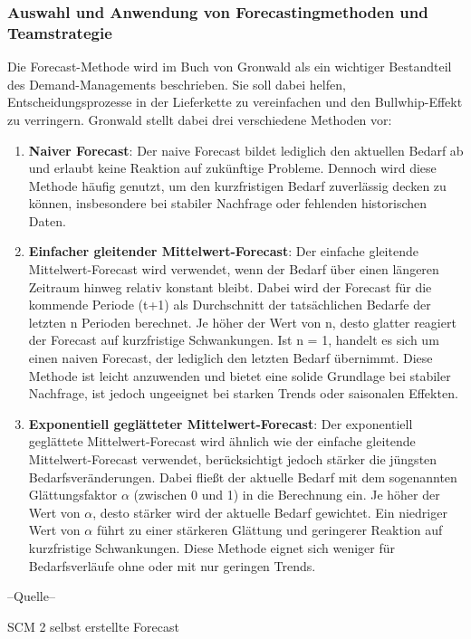 \documentclass[a4paper,12pt]{article}
\begin{document}
\subsubsection{Auswahl und Anwendung von Forecastingmethoden und Teamstrategie}
Die Forecast-Methode wird im Buch von Gronwald als ein wichtiger Bestandteil des Demand-Managements beschrieben.
Sie soll dabei helfen, Entscheidungsprozesse in der Lieferkette zu vereinfachen und den Bullwhip-Effekt zu verringern.
Gronwald stellt dabei drei verschiedene Methoden vor:
\begin{enumerate}
    \item \textbf{Naiver Forecast}:\newline
    Der naive Forecast bildet lediglich den aktuellen Bedarf ab und erlaubt keine Reaktion auf zukünftige Probleme.
    Dennoch wird diese Methode häufig genutzt, um den kurzfristigen Bedarf zuverlässig decken zu können,
    insbesondere bei stabiler Nachfrage oder fehlenden historischen Daten.
    \item \textbf{Einfacher gleitender Mittelwert-Forecast}:\newline
    Der einfache gleitende Mittelwert-Forecast wird verwendet, wenn der Bedarf über einen längeren Zeitraum hinweg relativ konstant bleibt.
    Dabei wird der Forecast für die kommende Periode (t+1) als Durchschnitt der tatsächlichen Bedarfe der letzten n Perioden berechnet.
    Je höher der Wert von n, desto glatter reagiert der Forecast auf kurzfristige Schwankungen.
    Ist n = 1, handelt es sich um einen naiven Forecast, der lediglich den letzten Bedarf übernimmt.
    Diese Methode ist leicht anzuwenden und bietet eine solide Grundlage bei stabiler Nachfrage,
    ist jedoch ungeeignet bei starken Trends oder saisonalen Effekten.
    \item \textbf{Exponentiell geglätteter Mittelwert-Forecast}:\newline
    Der exponentiell geglättete Mittelwert-Forecast wird ähnlich wie der einfache gleitende Mittelwert-Forecast verwendet,
    berücksichtigt jedoch stärker die jüngsten Bedarfsveränderungen.
    Dabei fließt der aktuelle Bedarf mit dem sogenannten Glättungsfaktor $\alpha$ (zwischen 0 und 1) in die Berechnung ein.
    Je höher der Wert von $\alpha$, desto stärker wird der aktuelle Bedarf gewichtet.
    Ein niedriger Wert von $\alpha$ führt zu einer stärkeren Glättung und geringerer Reaktion auf kurzfristige Schwankungen.
    Diese Methode eignet sich weniger für Bedarfsverläufe ohne oder mit nur geringen Trends.
\end{enumerate}
--Quelle--
\begin{table}[H]
    \centering
    \caption{SCM 2 selbst erstellte Forecast}
    \label{tab:SCM 2 selbst erstellte Forecast}
\end{table}
\end{document}
